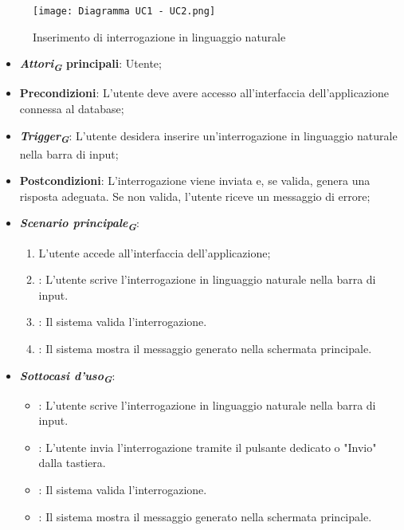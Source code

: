 \begin{figure}[h]
    \centering
    \texttt{[image: Diagramma UC1 - UC2.png]}
    \caption{Inserimento di interrogazione in linguaggio naturale}
\end{figure}

\begin{itemize}
    \item \textbf{\emph{Attori}\textsubscript{\textbf{\textit{G}}} principali}: Utente;
    \item \textbf{Precondizioni}: L'utente deve avere accesso all'interfaccia dell'applicazione connessa al database;
    \item \textbf{\emph{Trigger}\textsubscript{\textbf{\textit{G}}}}: L'utente desidera inserire un'interrogazione in linguaggio naturale nella barra di input;
    \item \textbf{Postcondizioni}: L'interrogazione viene inviata e, se valida, genera una risposta adeguata. Se non valida, l'utente riceve un messaggio di errore;
    \item \textbf{\emph{Scenario principale}\textsubscript{\textbf{\textit{G}}}}:
    \begin{enumerate}
        \item L'utente accede all'interfaccia dell'applicazione;
        \item {}: L'utente scrive l'interrogazione in linguaggio naturale nella barra di input.
        \item {}: Il sistema valida l'interrogazione.
        \item {}: Il sistema mostra il messaggio generato nella schermata principale.
    \end{enumerate}
    \item \textbf{\emph{Sottocasi d'uso}\textsubscript{\textbf{\textit{G}}}}:
    \begin{itemize}
        \item {}: L'utente scrive l'interrogazione in linguaggio naturale nella barra di input.
        \item {}: L'utente invia l'interrogazione tramite il pulsante dedicato o "Invio" dalla tastiera.
        \item {}: Il sistema valida l'interrogazione.
        \item {}: Il sistema mostra il messaggio generato nella schermata principale.

\end{itemize}
\end{itemize}
